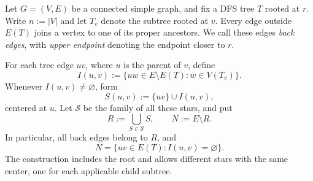 \documentclass[11pt]{amsart}
\newcommand{\1}{\mathbbm{1}}
\begin{document}
Let $G=(V,E)$ be a connected simple graph, and fix a DFS tree
$T$ rooted at $r$. Write $n:=|V|$ and let
$T_v$ denote the subtree rooted at $v$.
Every edge outside $E(T)$ joins a vertex to one of its
proper ancestors. We call these edges \emph{back edges}, with
\emph{upper endpoint} denoting the endpoint closer to $r$.

For each tree edge $uv$, where $u$ is the parent of $v$, define
\begin{equation}
\label{eq:DFS-back-edge-group}
    I(u,v):=\{uw\in E\setminus E(T):
                         w\in V(T_v)\}.
\end{equation}
Whenever $I(u,v)\ne\varnothing$, form
\begin{equation}
\label{eq:DFS-full-star}
    S(u,v):=\{uv\}\cup I(u,v),
\end{equation}
centered at $u$. Let $\mathcal S$ be the family of all these stars,
and put
\[
    R:=\bigcup_{S\in\mathcal{S}}S,
    \qquad N:=E\setminus R.
\]
In particular, all back edges belong to $R$, and
\[
    N=\{uv\in E(T):I(u,v)=\varnothing\}.
\]
The construction includes the root and allows different stars
with the same center, one for each applicable child subtree.
\end{document}

